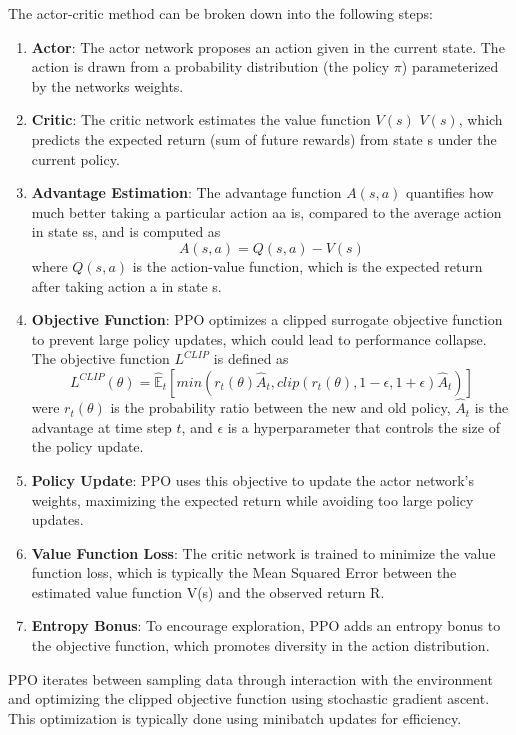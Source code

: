 The actor-critic method can be broken down into the following steps:
\begin{enumerate}
    \item \textbf{Actor}: The actor network proposes an action given in the current state. The action is drawn from a probability distribution (the policy $\pi$) parameterized by the networks weights.
    \item \textbf{Critic}: The critic network estimates the value function $V(s)$ $V(s)$, which predicts the expected return (sum of future rewards) from state s under the current policy.
    \item \textbf{Advantage Estimation}: The advantage function $A(s,a)$ quantifies how much better taking a particular action aa is, compared to the average action in state ss, and is computed as 
    \begin{equation}
        A(s,a) = Q(s,a) - V(s)
    \end{equation}
    where $Q(s,a)$ is the action-value function, which is the expected return after taking action a in state s.
    \item \textbf{Objective Function}:  PPO optimizes a clipped surrogate objective function to prevent large policy updates, which could lead to performance collapse. The objective function $L^{CLIP}$ is defined as
    \begin{equation}
        L^{CLIP}(\theta) = \hat{\mathbb{E}}_t[min(r_t(\theta)\hat{A}_t, clip(r_t(\theta), 1-\epsilon, 1+\epsilon)\hat{A}_t)]
    \end{equation}
    were $r_t(\theta)$ is the probability ratio between the new and old policy, $\hat{A}_t$ is the advantage at time step $t$, and $\epsilon$ is a hyperparameter that controls the size of the policy update.
    \item \textbf{Policy Update}: PPO uses this objective to update the actor network's weights, maximizing the expected return while avoiding too large policy updates.
    \item \textbf{Value Function Loss}: The critic network is trained to minimize the value function loss, which is typically the Mean Squared Error between the estimated value function V(s) and the observed return R.
    \item \textbf{Entropy Bonus}: To encourage exploration, PPO adds an entropy bonus to the objective function, which promotes diversity in the action distribution.
\end{enumerate}

PPO iterates between sampling data through interaction with the environment and optimizing the clipped objective function using stochastic gradient ascent. This optimization is typically done using minibatch updates for efficiency.

